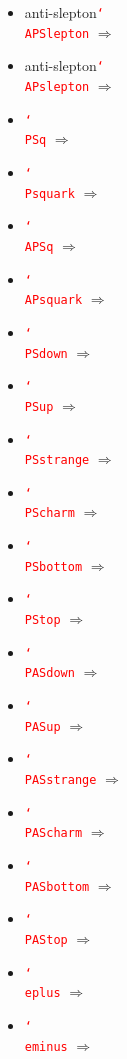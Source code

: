 \documentclass[12pt]{article}
\newcommand{\texcmd}[1]{\textcolor{red}{\texttt{\char`\\#1}}}
\begin{document}
\begin{multicols}{2}
{\begin{itemize}
\item anti-slepton\newline \texcmd{APSlepton} $\Rightarrow$ \APSlepton
\item anti-slepton\newline \texcmd{APslepton} $\Rightarrow$ \APslepton
\item  \texcmd{PSq} $\Rightarrow$ \PSq
\item  \texcmd{Psquark} $\Rightarrow$ \Psquark
\item  \texcmd{APSq} $\Rightarrow$ \APSq
\item  \texcmd{APsquark} $\Rightarrow$ \APsquark
\item  \texcmd{PSdown} $\Rightarrow$ \PSdown
\item  \texcmd{PSup} $\Rightarrow$ \PSup
\item  \texcmd{PSstrange} $\Rightarrow$ \PSstrange
\item  \texcmd{PScharm} $\Rightarrow$ \PScharm
\item  \texcmd{PSbottom} $\Rightarrow$ \PSbottom
\item  \texcmd{PStop} $\Rightarrow$ \PStop
\item  \texcmd{PASdown} $\Rightarrow$ \PASdown
\item  \texcmd{PASup} $\Rightarrow$ \PASup
\item  \texcmd{PASstrange} $\Rightarrow$ \PASstrange
\item  \texcmd{PAScharm} $\Rightarrow$ \PAScharm
\item  \texcmd{PASbottom} $\Rightarrow$ \PASbottom
\item  \texcmd{PAStop} $\Rightarrow$ \PAStop
\item  \texcmd{eplus} $\Rightarrow$ \eplus
\item  \texcmd{eminus} $\Rightarrow$ \eminus
\end{itemize}
}\end{multicols}
\clearpage
\end{document}

